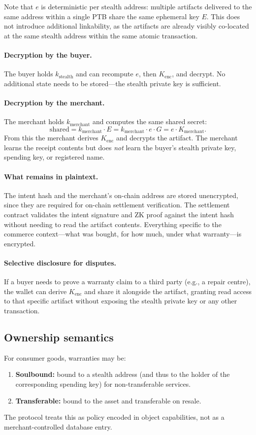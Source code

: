 \documentclass[11pt]{article}
\begin{document}
Note that $e$ is deterministic per stealth address: multiple artifacts delivered to the same address within a single PTB share the same ephemeral key $E$. This does not introduce additional linkability, as the artifacts are already visibly co-located at the same stealth address within the same atomic transaction.

\paragraph{Decryption by the buyer.}
The buyer holds $k_{\mathrm{stealth}}$ and can recompute $e$, then $K_{\mathrm{enc}}$, and decrypt. No additional state needs to be stored---the stealth private key is sufficient.

\paragraph{Decryption by the merchant.}
The merchant holds $k_{\mathrm{merchant}}$ and computes the same shared secret:
$$
\mathrm{shared} = k_{\mathrm{merchant}} \cdot E = k_{\mathrm{merchant}} \cdot e \cdot G = e \cdot K_{\mathrm{merchant}}.
$$
From this the merchant derives $K_{\mathrm{enc}}$ and decrypts the artifact. The merchant learns the receipt contents but does \emph{not} learn the buyer's stealth private key, spending key, or registered name.

\paragraph{What remains in plaintext.}
The intent hash and the merchant's on-chain address are stored unencrypted, since they are required for on-chain settlement verification. The settlement contract validates the intent signature and ZK proof against the intent hash without needing to read the artifact contents. Everything specific to the commerce context---what was bought, for how much, under what warranty---is encrypted.

\paragraph{Selective disclosure for disputes.}
If a buyer needs to prove a warranty claim to a third party (e.g., a repair centre), the wallet can derive $K_{\mathrm{enc}}$ and share it alongside the artifact, granting read access to that specific artifact without exposing the stealth private key or any other transaction.

\subsection{Ownership semantics}
For consumer goods, warranties may be:
\begin{enumerate}
  \item \textbf{Soulbound:} bound to a stealth address (and thus to the holder of the corresponding spending key) for non-transferable services.
  \item \textbf{Transferable:} bound to the asset and transferable on resale.
\end{enumerate}
The protocol treats this as policy encoded in object capabilities, not as a merchant-controlled database entry.
\end{document}
